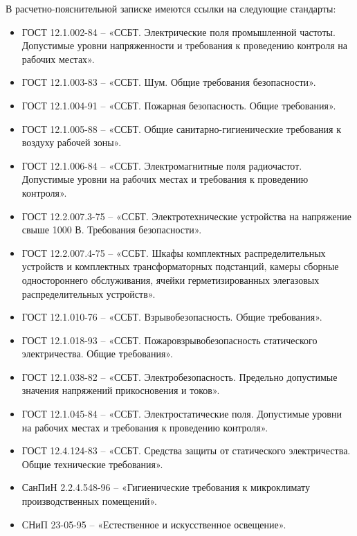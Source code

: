 В расчетно-пояснительной записке имеются ссылки на следующие стандарты:
\begin{itemize}
\item ГОСТ 12.1.002-84 -- «ССБТ. Электрические поля промышленной частоты. Допустимые уровни напряженности и требования к проведению контроля на рабочих местах».
\item ГОСТ 12.1.003-83 -- «ССБТ. Шум. Общие требования безопасности».
\item ГОСТ 12.1.004-91 -- «ССБТ. Пожарная безопасность. Общие требования».
\item ГОСТ 12.1.005-88 -- «ССБТ. Общие санитарно-гигиенические требования к воздуху рабочей зоны».
\item ГОСТ 12.1.006-84 -- «ССБТ. Электромагнитные поля радиочастот. Допустимые уровни на рабочих местах и требования к проведению контроля».
\item ГОСТ 12.2.007.3-75 -- «ССБТ. Электротехнические устройства на напряжение свыше 1000 В. Требования безопасности».
\item ГОСТ 12.2.007.4-75 -- «ССБТ. Шкафы комплектных распределительных устройств и комплектных трансформаторных подстанций, камеры сборные одностороннего обслуживания, ячейки герметизированных элегазовых распределительных устройств».
\item ГОСТ 12.1.010-76 -- «ССБТ. Взрывобезопасность. Общие требования».
\item ГОСТ 12.1.018-93 -- «ССБТ. Пожаровзрывобезопасность статического электричества. Общие требования».
\item ГОСТ 12.1.038-82 -- «ССБТ. Электробезопасность. Предельно допустимые значения напряжений прикосновения и токов».
\item ГОСТ 12.1.045-84 -- «ССБТ. Электростатические поля. Допустимые уровни на рабочих местах и требования к проведению контроля».
\item ГОСТ 12.4.124-83 -- «ССБТ. Средства защиты от статического электричества. Общие технические требования».
\item СанПиН 2.2.4.548-96 -- «Гигиенические требования к микроклимату производственных помещений».
\item СНиП 23-05-95 -- «Естественное и искусственное освещение».
\end{itemize}